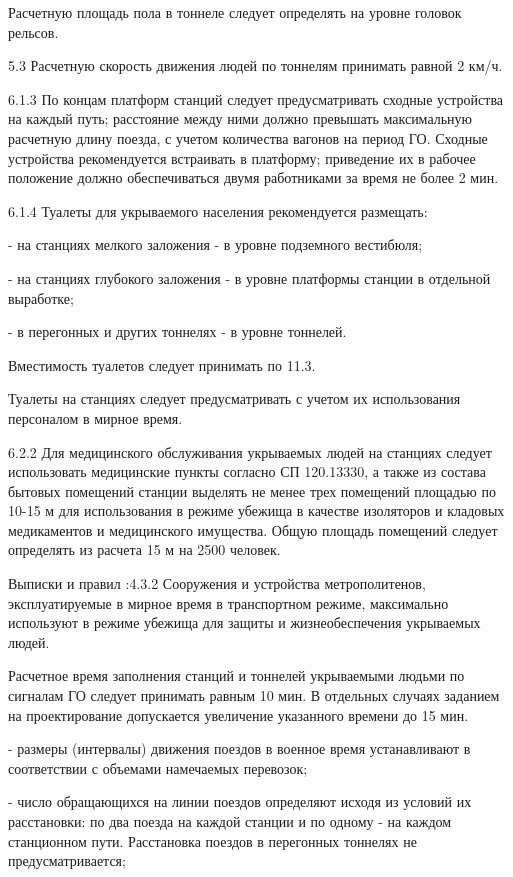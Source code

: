 \begin{itemize}
Расчетную площадь пола в тоннеле следует определять на уровне головок рельсов.

5.3 Расчетную скорость движения людей по тоннелям принимать равной 2 км/ч.

6.1.3 По концам платформ станций следует предусматривать сходные устройства на
каждый путь; расстояние между ними должно превышать максимальную расчетную
длину поезда, с учетом количества вагонов на период ГО. Сходные устройства
рекомендуется встраивать в платформу; приведение их в рабочее положение должно
обеспечиваться двумя работниками за время не более 2 мин.

6.1.4 Туалеты для укрываемого населения рекомендуется размещать:

- на станциях мелкого заложения - в уровне подземного вестибюля;

- на станциях глубокого заложения - в уровне платформы станции в отдельной
выработке;

- в перегонных и других тоннелях - в уровне тоннелей.

Вместимость туалетов следует принимать по 11.3.

Туалеты на станциях следует предусматривать с учетом их использования
персоналом в мирное время.

6.2.2 Для медицинского обслуживания укрываемых людей на станциях следует
использовать медицинские пункты согласно СП 120.13330, а также из состава
бытовых помещений станции выделять не менее трех помещений площадью по 10-15 м
для использования в режиме убежища в качестве изоляторов и кладовых
медикаментов и медицинского имущества. Общую площадь помещений следует
определять из расчета 15 м на 2500 человек.


Выписки и правил :4.3.2 Сооружения и устройства метрополитенов, эксплуатируемые
в мирное время в транспортном режиме, максимально используют в режиме убежища
для защиты и жизнеобеспечения укрываемых людей.

Расчетное время заполнения станций и тоннелей укрываемыми людьми по сигналам ГО
следует принимать равным 10 мин. В отдельных случаях заданием на проектирование
допускается увеличение указанного времени до 15 мин.

- размеры (интервалы) движения поездов в военное время устанавливают в
соответствии с объемами намечаемых перевозок;

- число обращающихся на линии поездов определяют исходя из условий их
расстановки: по два поезда на каждой станции и по одному - на каждом
станционном пути. Расстановка поездов в перегонных тоннелях не
предусматривается;


\end{itemize}
